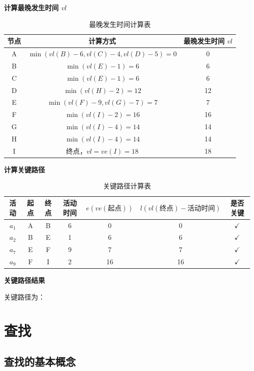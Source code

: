 \documentclass[lang=cn,newtx,10pt,scheme=chinese]{elegantbook}
\begin{document}
\textbf{计算最晚发生时间 $vl$}
\begin{table}[h]
    \centering
    \begin{tabular}{c|c|c}
        \toprule
        \textbf{节点} & \textbf{计算方式} & \textbf{最晚发生时间 $vl$} \\
        \midrule
        A & $\min(vl(B) - 6, vl(C) - 4, vl(D) - 5) = 0$ & 0 \\
        B & $\min(vl(E) - 1) = 6$ & 6 \\
        C & $\min(vl(E) - 1) = 6$ & 6 \\
        D & $\min(vl(H) - 2) = 12$ & 12 \\
        E & $\min(vl(F) - 9, vl(G) - 7) = 7$ & 7 \\
        F & $\min(vl(I) - 2) = 16$ & 16 \\
        G & $\min(vl(I) - 4) = 14$ & 14 \\
        H & $\min(vl(I) - 4) = 14$ & 14 \\
        I & 终点，$vl = ve(I) = 18$ & 18 \\
        \bottomrule
    \end{tabular}
    \caption{最晚发生时间计算表}
\end{table}

\textbf{计算关键路径}
\begin{table}[h]
    \centering
    \begin{tabular}{c|c|c|c|c|c|c}
        \toprule
        \textbf{活动} & \textbf{起点} & \textbf{终点} & \textbf{活动时间} & $e (ve(起点))$ & $l (vl(终点) - 活动时间)$ & \textbf{是否关键} \\
        \midrule
        $a_1$ & A & B & 6 & 0 & 0 & $\checkmark$ \\
        $a_2$ & B & E & 1 & 6 & 6 & $\checkmark$ \\
        $a_7$ & E & F & 9 & 7 & 7 & $\checkmark$ \\
        $a_9$ & F & I & 2 & 16 & 16 & $\checkmark$ \\
        \bottomrule
    \end{tabular}
    \caption{关键路径计算表}
\end{table}

\textbf{关键路径结果}

关键路径为：

\chapter{查找}

\section{查找的基本概念}
\end{document}
